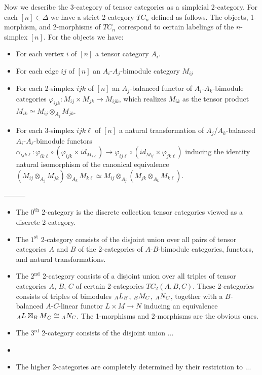 \documentclass{amsart}
\begin{document}
Now we describe the 3-category of tensor categories as a simplcial 2-category. For each $[n] \in \Delta$ we have a strict 2-category $TC_n$ defined as follows. The objects, 1-morphism, and 2-morphisms of $TC_n$ correspond to certain labelings of the $n$-simplex $[n]$. For the objects we have:
\begin{itemize}
	\item For each vertex $i$ of $[n]$ a tensor category $A_i$. 
	\item For each edge $ij$ of $[n]$ an $A_i$-$A_j$-bimodule category $M_{ij}$
	\item For each 2-simplex $ijk$ of $[n]$ an $A_j$-balanced functor of $A_i$-$A_k$-bimodule categories $\varphi_{ijk}: M_{ij} \times M_{jk} \to M_{ijk}$, which realizes $M_{ik}$ as the tensor product $M_{ik} \simeq M_{ij} \otimes_{A_j} M_{jk}$. 
	\item For each 3-simplex $ijk\ell$ of $[n]$ a natural transformation of $A_j$/$A_k$-balanced $A_i$-$A_\ell$-bimodule functors $\alpha_{ijk \ell}: \varphi_{i k \ell} \circ (\varphi_{ijk} \times id_{M_{k\ell}}) \to \varphi_{ij \ell} \circ (id_{M_{ij}} \times \varphi_{jk\ell})$ inducing the identity natural isomorphism of the canonical equivalence $(M_{ij} \otimes_{A_j} M_{jk}) \otimes_{A_k} M_{k\ell} \simeq M_{ij} \otimes_{A_j}( M_{jk} \otimes_{A_k} M_{k\ell}).$
\end{itemize}




--------- 

\begin{itemize}
	\item The $0^\text{th}$ 2-category is the discrete collection tensor categories viewed as a discrete 2-category. 
	\item The $1^\text{st}$ 2-category consists of the disjoint union over all pairs of tensor categories $A$ and $B$ of the 2-categories of $A$-$B$-bimodule categories, functors, and natural transformations. 
	\item The $2^\text{nd}$ 2-category consists of a disjoint union over all triples of tensor categories $A$, $B$, $C$ of certain 2-categories $TC_2(A,B,C)$. These 2-categories consists of triples of bimodules $ {}_{A} {L}_{B}$, $ {}_{B} {M}_{C}$, $ {}_{A} {N}_{C}$, together with a $B$-balanced $A$-$C$-linear functor $L \times M \to N$ inducing an equivalence ${}_{A} {L \boxtimes_B M }_{C} \cong  {}_{A} {N }_{C}$. The 1-morphisms and 2-morphisms are the obvious ones. 
	\item The $3^\text{rd}$ 2-category consists of the disjoint union ...
	\item 
	\item The higher 2-categories are completely determined by their restriction to ... 
\end{itemize}
\end{document}
